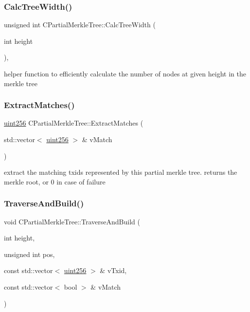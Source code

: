 \subsubsection{\texorpdfstring{Calc\+Tree\+Width()}{CalcTreeWidth()}}
{\footnotesize\ttfamily unsigned int C\+Partial\+Merkle\+Tree\+::\+Calc\+Tree\+Width (\begin{DoxyParamCaption}\item[{int}]{height }\end{DoxyParamCaption})\hspace{0.3cm}{\ttfamily [inline]}, {\ttfamily [protected]}}

helper function to efficiently calculate the number of nodes at given height in the merkle tree \mbox{\label{class_c_partial_merkle_tree_a28c3456d1159b33b6c2689ac88eb56ad}} 
\subsubsection{\texorpdfstring{Extract\+Matches()}{ExtractMatches()}}
{\footnotesize\ttfamily \mbox{\hyperlink{classuint256}{uint256}} C\+Partial\+Merkle\+Tree\+::\+Extract\+Matches (\begin{DoxyParamCaption}\item[{std\+::vector$<$ \mbox{\hyperlink{classuint256}{uint256}} $>$ \&}]{v\+Match }\end{DoxyParamCaption})}

extract the matching txid\textquotesingle{}s represented by this partial merkle tree. returns the merkle root, or 0 in case of failure \mbox{\label{class_c_partial_merkle_tree_a62bdcaf5b5ee6c6327ef67fb027a5fef}} 
\subsubsection{\texorpdfstring{Traverse\+And\+Build()}{TraverseAndBuild()}}
{\footnotesize\ttfamily void C\+Partial\+Merkle\+Tree\+::\+Traverse\+And\+Build (\begin{DoxyParamCaption}\item[{int}]{height,  }\item[{unsigned int}]{pos,  }\item[{const std\+::vector$<$ \mbox{\hyperlink{classuint256}{uint256}} $>$ \&}]{v\+Txid,  }\item[{const std\+::vector$<$ bool $>$ \&}]{v\+Match }\end{DoxyParamCaption})\hspace{0.3cm}{\ttfamily [protected]}}

